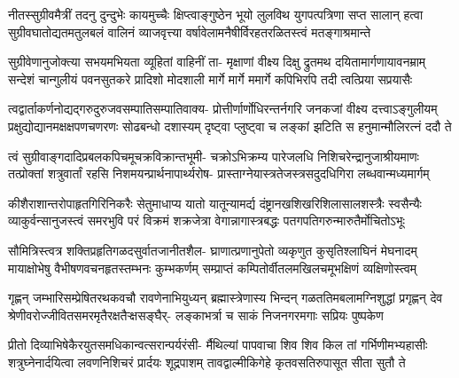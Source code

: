 
\translink{}

\storymeta


\fourlineindentedshloka
{नीतस्सुग्रीवमैत्रीं तदनु दुन्दुभेः कायमुच्चैः}
{क्षिप्त्वाङ्गुष्ठेन भूयो लुलविथ युगपत्पत्रिणा सप्त सालान्}
{हत्वा सुग्रीवघातोद्यतमतुलबलं वालिनं व्याजवृत्त्या}
{वर्षावेलामनैषीर्विरहतरळितस्त्वं मतङ्गाश्रमान्ते} %

\fourlineindentedshloka
{सुग्रीवेणानुजोक्त्या सभयमभियता व्यूहितां वाहिनीं ता-}
{मृक्षाणां वीक्ष्य दिक्षु द्रुतमथ दयितामार्गणायावनम्राम्}
{सन्देशं चान्गुलीयं पवनसुतकरे प्रादिशो मोदशाली}
{मार्गे मार्गे ममार्गे कपिभिरपि तदी त्वत्प्रिया सप्रयासैः} %

\fourlineindentedshloka
{त्वद्वार्ताकर्णनोद्यद्गरुदुरुजवसम्पातिसम्पातिवाक्य-}
{प्रोत्तीर्णार्णोधिरन्तर्नगरि जनकजां वीक्ष्य दत्त्वाऽङ्गुलीयम्}
{प्रक्षुद्योद्यानमक्षक्षपणचणरणः सोढबन्धो दशास्यम्}
{दृष्ट्वा प्लुष्ट्वा च लङ्कां झटिति स हनुमान्मौलिरत्नं ददौ ते} %

\fourlineindentedshloka
{त्वं सुग्रीवाङ्गदादिप्रबलकपिचमूचक्रविक्रान्तभूमी-}
{चक्रोऽभिक्रम्य पारेजलधि निशिचरेन्द्रानुजाश्रीयमाणः}
{तत्प्रोक्तां शत्रुवार्तां रहसि निशमयन्प्रार्थनापार्थ्यरोष-}
{प्रास्ताग्नेयास्त्रतेजस्त्रसदुदधिगिरा लब्धवान्मध्यमार्गम्} %

\fourlineindentedshloka
{कीशैराशान्तरोपाहृतगिरिनिकरैः सेतुमाधाप्य यातो}
{यातून्यामर्द्य दंष्ट्रानखशिखरिशिलासालशस्त्रैः स्वसैन्यैः}
{व्याकुर्वन्सानुजस्त्वं समरभुवि परं विक्रमं शक्रजेत्रा}
{वेगान्नागास्त्रबद्धः पतगपतिगरुन्मारुतैर्मोचितोऽभूः} %

\fourlineindentedshloka
{सौमित्रिस्त्वत्र शक्तिप्रहृतिगळदसुर्वातजानीतशैल-}
{घ्राणात्प्रणानुपेतो व्यकृणुत कुसृतिश्लाघिनं मेघनादम्}
{मायाक्षोभेषु वैभीषणवचनहृतस्तम्भनः कुम्भकर्णम्}
{सम्प्राप्तं कम्पितोर्वीतलमखिलचमूभक्षिणं व्यक्षिणोस्त्वम्} %

\fourlineindentedshloka
{गृह्णन् जम्भारिसम्प्रेषितरथकवचौ रावणेनाभियुध्यन्}
{ब्रह्मास्त्रेणास्य भिन्दन् गळततिमबलामग्निशुद्धां प्रगृह्णन्}
{देव श्रेणीवरोज्जीवितसमरमृतैरक्षतैऱ्क्षसङ्घैर्-}
{लङ्काभर्त्रा च साकं निजनगरमगाः सप्रियः पुष्पकेण} %

\fourlineindentedshloka
{प्रीतो दिव्याभिषेकैरयुतसमधिकान्वत्सरान्पर्यरंसी-}
{र्मैथिल्यां पापवाचा शिव शिव किल तां गर्भिणीमभ्यहासीः}
{शत्रुघ्नेनार्दयित्वा लवणनिशिचरं प्रार्दयः शूद्रपाशम्}
{तावद्वाल्मीकिगेहे कृतवसतिरुपासूत सीता सुतौ ते} %

